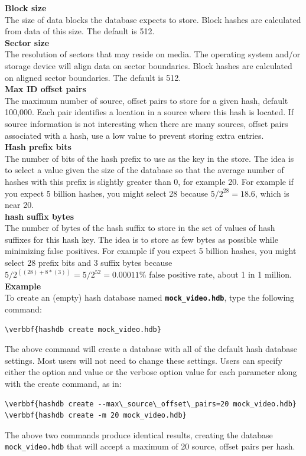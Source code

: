 \documentclass[11pt,fleqn]{article} %
\begin{document}
\textbf{Block size}\\
The size of data blocks the database expects to store. Block hashes are calculated from data of this size. The default is 512.\\

\textbf{Sector size}\\
The resolution of sectors that may reside on media. The operating system and/or storage device will align data on sector boundaries. Block hashes are calculated on aligned sector boundaries. The default is 512.\\

\textbf{Max ID offset pairs}\\
The maximum number of source, offset pairs to store for a given hash, default 100,000. Each pair identifies a location in a source where this hash is located. If source information is not interesting when there are many sources, offset pairs associated with a hash, use a low value to prevent storing extra entries.\\

\textbf{Hash prefix bits}\\
The number of bits of the hash prefix to use as the key in the store. The idea is to select a value given the size of the database so that the average number of hashes with this prefix is slightly greater than 0, for example 20. For example if you expect 5 billion hashes, you might select 28 because $5/2^{28}=18.6$, which is near 20.\\

\textbf{hash suffix bytes}\\
The number of bytes of the hash suffix to store in the set of values of hash suffixes for this hash key. The idea is to store as few bytes as possible while minimizing false positives. For example if you expect 5 billion hashes, you might select 28 prefix bits and 3 suffix bytes because $5 / 2^{((28) + 8*(3))} = 5 / 2^{52} = 0.00011\%$ false positive rate, about 1 in 1 million.\\

\textbf{Example}\\
To create an (empty) hash database named \textbf{\texttt{mock\_video.hdb}}, type the following command:
\begin{Verbatim}[commandchars=\\\{\}]
\verbbf{hashdb create mock_video.hdb}
\end{Verbatim}
The above command will create a database with all of the default hash database settings. Most users will not need to change these settings.
Users can specify either the option and value or the verbose option value for each parameter along with the create command, as in:\\
\begin{Verbatim}[commandchars=\\\{\}]
\verbbf{hashdb create --max\_source\_offset\_pairs=20 mock_video.hdb}
\verbbf{hashdb create -m 20 mock_video.hdb}
\end{Verbatim}
The above two commands produce identical results, creating the database \texttt{mock\_video.hdb} that will accept a maximum of 20 source, offset pairs per hash.\\
\end{document}
